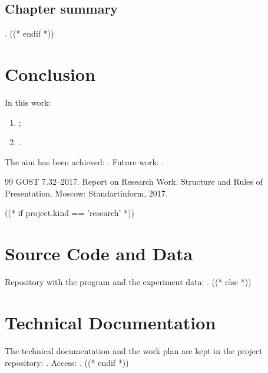 \documentclass[12pt,a4paper]{extreport}
\begin{document}
\section{Chapter summary}
.
((* endif *))

\clearpage
\chapter*{Conclusion}
In this work:
\begin{enumerate}[label=\arabic*), leftmargin=1.25cm]
  \item {};
  \item {}.
\end{enumerate}
The aim has been achieved: .
Future work: .

\clearpage
{}
{}
\begin{thebibliography}{99}
  GOST 7.32--2017. Report on Research Work. Structure and Rules of Presentation. Moscow: Standartinform, 2017.
\end{thebibliography}

\clearpage
\appendix
{}
((* if project.kind == 'research' *))
\chapter{Source Code and Data}
Repository with the program and the experiment data: .
((* else *))
\chapter{Technical Documentation}
The technical documentation and the work plan are kept in the project
repository: . Access: .
((* endif *))
\end{document}
